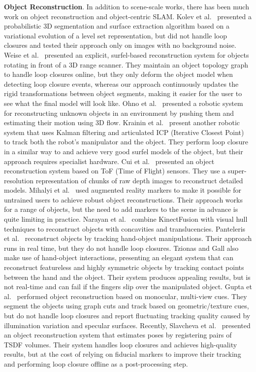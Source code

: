 \textbf{Object Reconstruction}. In addition to scene-scale works, there has been much work on object reconstruction and object-centric SLAM. Kolev et al.\ \cite{Kolev2006} presented a probabilistic 3D segmentation and surface extraction algorithm based on a variational evolution of a level set representation, but did not handle loop closures and tested their approach only on images with no background noise. Weise et al.\ \cite{Weise2009} presented an explicit, surfel-based reconstruction system for objects rotating in front of a 3D range scanner. They maintain an object topology graph to handle loop closures online, but they only deform the object model when detecting loop closure events, whereas our approach continuously updates the rigid transformations between object segments, making it easier for the user to see what the final model will look like. Ohno et al.\ \cite{Ohno2011} presented a robotic system for reconstructing unknown objects in an environment by pushing them and estimating their motion using 3D flow. Krainin et al.\ \cite{Krainin2011IJRR} present another robotic system that uses Kalman filtering and articulated ICP (Iterative Closest Point) to track both the robot's manipulator and the object. They perform loop closure in a similar way to \cite{Weise2009} and achieve very good surfel models of the object, but their approach requires specialist hardware. Cui et al.\ \cite{Cui2013} presented an object reconstruction system based on ToF (Time of Flight) sensors. They use a super-resolution representation of chunks of raw depth images to reconstruct detailed models. Mihalyi et al.\ \cite{Mihalyi2015} used augmented reality markers to make it possible for untrained users to achieve robust object reconstructions. Their approach works for a range of objects, but the need to add markers to the scene in advance is quite limiting in practice. Narayan et al.\ \cite{Narayan2015} combine KinectFusion with visual hull techniques to reconstruct objects with concavities and translucencies. Panteleris et al.\ \cite{Pantaleris2015, Panteleris2015b} reconstruct objects by tracking hand-object manipulations. Their approach runs in real time, but they do not handle loop closures. Tzionas and Gall \cite{Tzionas2015} also make use of hand-object interactions, presenting an elegant system that can reconstruct featureless and highly symmetric objects by tracking contact points between the hand and the object. Their system produces appealing results, but is not real-time and can fail if the fingers slip over the manipulated object. Gupta et al.\ \cite{Gupta2016} performed object reconstruction based on monocular, multi-view cues. They segment the objects using graph cuts and track based on geometric/texture cues, but do not handle loop closures and report fluctuating tracking quality caused by illumination variation and specular surfaces. Recently, Slavcheva et al.\ \cite{slavcheva2016eccv} presented an object reconstruction system that estimates poses by registering pairs of TSDF volumes. Their system handles loop closures and achieves high-quality results, but at the cost of relying on fiducial markers to improve their tracking and performing loop closure offline as a post-processing step.

